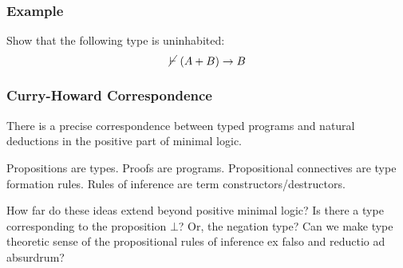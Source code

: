\documentclass{beamer}
\theoremstyle{indentDefn} \newtheorem{defn}[]{Definition}
\begin{document}



\begin{frame}
  \frametitle{Example}
  Show that the following type is uninhabited:
  $$ \cancel{\vdash} \ (A + B) \to B$$ 
  

  \vspace{6cm}

\end{frame}




\begin{frame}
  \frametitle{Curry-Howard Correspondence}

  There is a precise correspondence between typed programs and natural deductions in the positive part of minimal logic. 

  \vspace{5mm}

  Propositions are types. Proofs are programs. Propositional connectives are type formation rules. Rules of inference are term constructors/destructors. 

  \vspace{5mm}

  How far do these ideas extend beyond positive minimal logic? Is there a type corresponding to the proposition $\bot$? Or, the negation type? Can we make type theoretic sense of the propositional rules of inference ex falso and reductio ad absurdrum? 

\end{frame}
\end{document}
